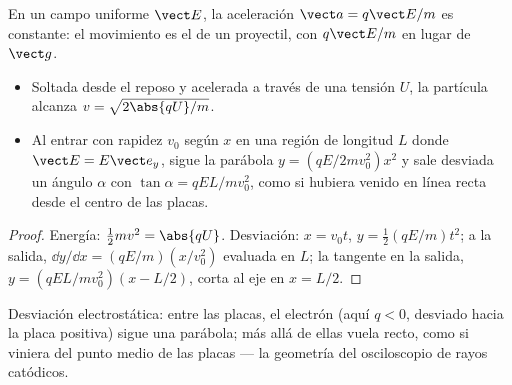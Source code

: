 \begin{proposition}\label{prop:b1:charged-particles:efield}
En un campo uniforme $\vect E$, la aceleración $\vect a = q\vect E/m$ es
constante: el movimiento es el de un proyectil, con $q\vect E/m$ en lugar
de $\vect g$.
\begin{itemize}
  \item Soltada desde el reposo y acelerada a través de una tensión $U$,
        la partícula alcanza $v = \sqrt{2\abs{qU}/m}$.
  \item Al entrar con rapidez $v_0$ según $x$ en una región de longitud
        $L$ donde $\vect E = E\vect e_y$, sigue la parábola
        $y = (qE/2mv_0^2)x^2$ y sale desviada un ángulo $\alpha$ con $\tan\alpha =
        qEL/mv_0^2$, como si hubiera venido en línea recta desde el centro
        de las placas.
\end{itemize}
\end{proposition}

\begin{proof}
Energía: $\tfrac12 mv^2 = \abs{qU}$. Desviación: $x = v_0t$, $y =
\tfrac12(qE/m)t^2$; a la salida, $\dd y/\dd x = (qE/m)(x/v_0^2)$ evaluada
en $L$; la tangente en la salida, $y = (qEL/mv_0^2)(x - L/2)$, corta al eje
en $x = L/2$.
\end{proof}

\begin{omfigure}

{\small Desviación electrostática: entre las placas, el electrón (aquí
$q < 0$, desviado hacia la placa positiva) sigue una parábola; más allá de
ellas vuela recto, como si viniera del punto medio de las placas --- la
geometría del osciloscopio de rayos catódicos.}
\end{omfigure}

